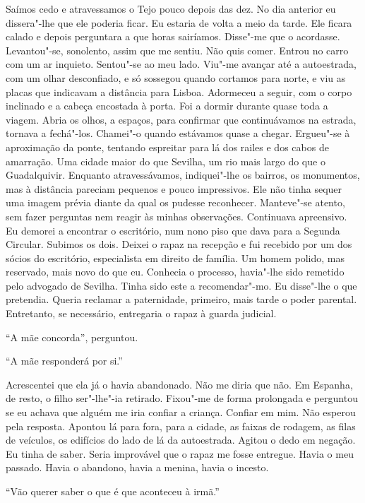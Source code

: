 Saímos cedo e atravessamos o Tejo pouco depois das dez. No dia anterior
eu dissera"-lhe que ele poderia ficar. Eu estaria de volta a meio da
tarde. Ele ficara calado e depois perguntara a que horas sairíamos.
Disse"-me que o acordasse. Levantou"-se, sonolento, assim que me sentiu.
Não quis comer. Entrou no carro com um ar inquieto. Sentou"-se ao meu
lado. Viu"-me avançar até a autoestrada, com um olhar desconfiado, e
só sossegou quando cortamos para norte, e viu as placas que indicavam a
distância para Lisboa. Adormeceu a seguir, com o corpo inclinado e a
cabeça encostada à porta. Foi a dormir durante quase toda a viagem.
Abria os olhos, a espaços, para confirmar que continuávamos na estrada,
tornava a fechá"-los. Chamei"-o quando estávamos quase a chegar.
Ergueu"-se à aproximação da ponte, tentando espreitar para lá dos railes
e dos cabos de amarração. Uma cidade maior do que Sevilha, um rio mais
largo do que o Guadalquivir. Enquanto atravessávamos, indiquei"-lhe os
bairros, os monumentos, mas à distância pareciam pequenos e pouco
impressivos. Ele não tinha sequer uma imagem prévia diante da qual os
pudesse reconhecer. Manteve"-se atento, sem fazer perguntas nem reagir
às minhas observações. Continuava apreensivo. Eu demorei a encontrar o
escritório, num nono piso que dava para a Segunda Circular. Subimos os
dois. Deixei o rapaz na recepção e fui recebido por um dos sócios do
escritório, especialista em direito de família. Um homem polido, mas
reservado, mais novo do que eu. Conhecia o processo, havia"-lhe sido
remetido pelo advogado de Sevilha. Tinha sido este a recomendar"-mo. Eu
disse"-lhe o que pretendia. Queria reclamar a paternidade, primeiro,
mais tarde o poder parental. Entretanto, se necessário, entregaria o
rapaz à guarda judicial.

``A mãe concorda'',
perguntou.

``A mãe responderá por si.''

Acrescentei que ela já o havia abandonado. Não me diria que não. Em
Espanha, de resto, o filho ser"-lhe"-ia retirado. Fixou"-me de forma
prolongada e perguntou se eu achava que alguém me iria confiar a
criança. Confiar em mim. Não esperou pela resposta. Apontou lá para
fora, para a cidade, as faixas de rodagem, as filas de veículos, os
edifícios do lado de lá da autoestrada. Agitou o dedo em negação. Eu
tinha de saber. Seria improvável que o rapaz me fosse entregue. Havia o
meu passado. Havia o abandono, havia a menina, havia o incesto.

``Vão querer saber o que é que aconteceu à irmã.''

